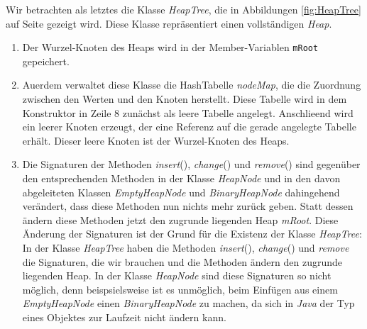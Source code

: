 Wir betrachten als letztes die
Klasse \textsl{HeapTree}, die in Abbildungen \ref{fig:HeapTree} auf Seite
\pageref{fig:HeapTree} gezeigt wird.  Diese Klasse repr\"asentiert einen vollst\"andigen
\textsl{Heap}.  
\begin{enumerate}
\item Der Wurzel-Knoten  des Heaps wird in der Member-Variablen \texttt{mRoot}
      gepeichert. 
\item Au\3erdem verwaltet diese Klasse die HashTabelle \textsl{nodeMap}, die
      die Zuordnung zwischen den Werten und den Knoten herstellt.  Diese Tabelle
      wird in dem Konstruktor in Zeile 8 zun\"achst als leere Tabelle angelegt.
      Anschlie\3end wird ein leerer Knoten erzeugt, der eine Referenz auf die
      gerade angelegte Tabelle erh\"alt.  Dieser leere Knoten ist der Wurzel-Knoten
      des Heaps.
\item Die Signaturen der Methoden \textsl{insert}(), \textsl{change}() und
      \textsl{remove}() sind gegen\"uber den entsprechenden Methoden in der Klasse
      \textsl{HeapNode} und in den davon abgeleiteten Klassen
      \textsl{EmptyHeapNode} und \textsl{BinaryHeapNode} dahingehend ver\"andert,
      dass diese Methoden nun nichts mehr zur\"uck geben. Statt dessen \"andern
      diese Methoden jetzt den zugrunde liegenden Heap \textsl{mRoot}.  Diese
      Änderung der Signaturen ist der Grund f\"ur die Existenz der Klasse
      \textsl{HeapTree}: In der Klasse \textsl{HeapTree} haben die Methoden
      \textsl{insert}(), \textsl{change}() und \textsl{remove} die Signaturen,
      die wir brauchen und die Methoden \"andern den zugrunde liegenden Heap.  
      In der Klasse \textsl{HeapNode} sind diese Signaturen so nicht m\"oglich,
      denn beispsielsweise ist es unm\"oglich, beim Einf\"ugen aus einem
      \textsl{EmptyHeapNode} einen \textsl{BinaryHeapNode} zu machen, da sich in
      \textsl{Java} der Typ eines Objektes zur Laufzeit nicht \"andern kann.
\end{enumerate}

